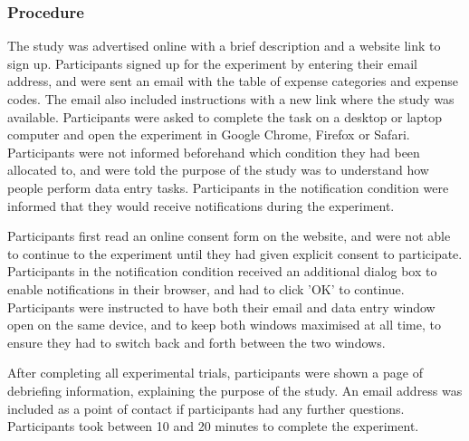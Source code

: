 \subsubsection{Procedure}
The study was advertised online with a brief description and a website link to sign up. Participants signed up for the experiment by entering their email address, and were sent an email with the table of expense categories and expense codes. The email also included instructions with a new link where the study was available. Participants were asked to complete the task on a desktop or laptop computer and open the experiment in Google Chrome, Firefox or Safari. Participants were not informed beforehand which condition they had been allocated to, and were told the purpose of the study was to understand how people perform data entry tasks. Participants in the notification condition were informed that they would receive notifications during the experiment. 

Participants first read an online consent form on the website, and were not able to continue to the experiment until they had given explicit consent to participate. Participants in the notification condition received an additional dialog box to enable notifications in their browser, and had to click 'OK' to continue. Participants were instructed to have both their email and data entry window open on the same device, and to keep both windows maximised at all time, to ensure they had to switch back and forth between the two windows. 

After completing all experimental trials, participants were shown a page of debriefing information, explaining the purpose of the study. An email address was included as a point of contact if participants had any further questions. Participants took between 10 and 20 minutes to complete the experiment.

